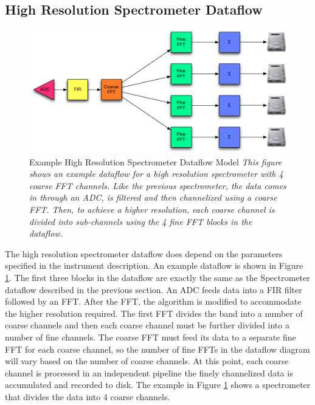 \subsection{High Resolution Spectrometer Dataflow}

\begin{figure}[ht!]
  \centering
    \includegraphics[width=1\textwidth]{Images/C4/hires_spectrometer_dataflow.pdf}
  \caption[Example High Resolution Spectrometer Dataflow Model]{Example High Resolution Spectrometer Dataflow Model
  \textit{
  This figure shows an example dataflow for a high resolution spectrometer with 4 coarse FFT channels.
  Like the previous spectrometer, the data comes in through an ADC, is filtered and then channelized using a coarse FFT.
  Then, to achieve a higher resolution, each coarse channel is divided into sub-channels using the 4 fine FFT blocks in the dataflow. 
  }}

  \label{fig: C4/hires_spectrometer_dataflow.pdf}
\end{figure}

The high resolution spectrometer dataflow does depend on the parameters specified in the instrument description. 
An example dataflow is shown in Figure \ref{fig: C4/hires_spectrometer_dataflow.pdf}. 
The first three blocks in the dataflow are exactly the same as the Spectrometer dataflow described in the previous section. 
An ADC feeds data into a FIR filter followed by an FFT. 
After the FFT, the algorithm is modified to accommodate the higher resolution required. 
The first FFT divides the band into a number of coarse channels and then each coarse channel must be further divided into a number of fine channels. 
The coarse FFT must feed its data to a separate fine FFT for each coarse channel, so the number of fine FFTs in the dataflow diagram will vary based on the number of coarse channels.
At this point, each coarse channel is processed in an independent pipeline the finely channelized data is accumulated and recorded to disk. 
The example in Figure \ref{fig: C4/hires_spectrometer_dataflow.pdf} shows a spectrometer that divides the data into 4 coarse channels.

